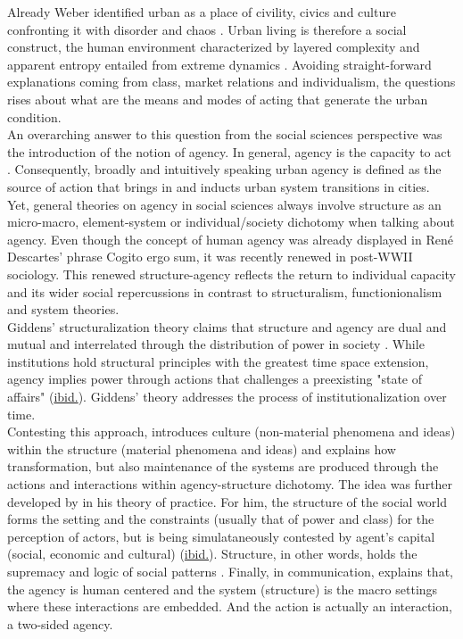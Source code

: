 \documentclass[11pt]{report}
\begin{document}
Already Weber identified  urban as a place of civility, civics and culture confronting it with disorder and chaos \cite{Weber ???}. Urban living is therefore a social construct, the human environment characterized by layered complexity and apparent entropy entailed from extreme dynamics \cite{(Jacobs 2000)}.
Avoiding straight-forward explanations coming from class, market relations and  individualism, the questions rises about what are the means and modes of acting that generate the urban condition.
\\
An overarching answer to this question from the social sciences perspective was the introduction of the notion of agency.
In general, agency is the capacity to act \cite{dictionary????}.
Consequently, broadly and intuitively speaking urban agency is defined as the source of action that brings in and inducts urban system transitions in cities.
\\

Yet, general theories on agency in social sciences always involve structure as an micro-macro, element-system or individual/society dichotomy when talking about agency.
Even though the concept of human agency was already displayed in René Descartes' phrase Cogito ergo sum, it was recently renewed in post-WWII sociology.
This renewed structure-agency reflects the return to individual capacity and its wider social repercussions in contrast to structuralism, functionionalism and system theories.
\\

Giddens' structuralization theory claims that structure and agency are dual and mutual and interrelated through the distribution of power in society \cite{Giddens constitution of society}.
While institutions hold structural principles with the greatest time space extension, agency implies power through actions that challenges a preexisting "state of affairs" (\href{Giddens}{ibid.}).
Giddens' theory addresses the process of institutionalization over time.
\\

Contesting this approach, \cite{Archer (1982)???} introduces culture (non-material phenomena and ideas) within the structure (material phenomena and ideas) and explains how transformation, but also maintenance of the systems are produced through the actions and interactions within agency-structure dichotomy.
The idea was further developed by \cite{Bourdieu (XXX)} in his theory of practice.
For him, the structure of the social world forms the setting and the constraints (usually that of power and class) for the perception of actors, but is being simulataneously contested by agent's capital (social, economic and cultural) (\href{Bourdieu}{ibid.}).
Structure, in other words, holds the supremacy and logic of social patterns \href{Rafiee}{\cite{rafiee_relationship_2014}}.
Finally, in communication, \cite{Habermas (XXXX)} explains that, the agency is human centered and the system (structure) is the macro settings where these interactions are embedded. And the action is actually an interaction, a two-sided agency.
\\
\end{document}
